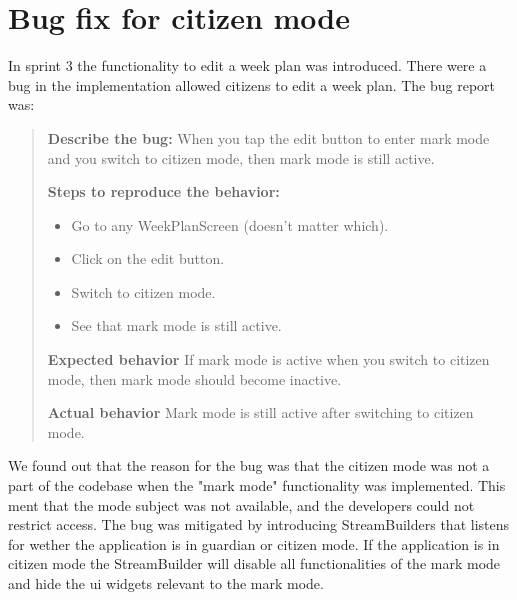 \section{Bug fix for citizen mode}
In sprint 3 the functionality to edit a week plan was introduced. There were a bug in the implementation allowed citizens to edit a week plan. The bug report was:

\begin{quote}
  \textbf{Describe the bug:} When you tap the edit button to enter mark mode and you switch to citizen mode, then mark mode is still active.

  \textbf{Steps to reproduce the behavior:}
  \begin{itemize}
    \item Go to any WeekPlanScreen (doesn't matter which).
    \item Click on the edit button.
    \item Switch to citizen mode.
    \item See that mark mode is still active.
  \end{itemize}

  \textbf{Expected behavior}
  If mark mode is active when you switch to citizen mode, then mark mode should become inactive.

  \textbf{Actual behavior}
  Mark mode is still active after switching to citizen mode.
\end{quote}

We found out that the reason for the bug was that the citizen mode was not a part of the codebase when the "mark mode" functionality was implemented. This ment that the mode subject was not available, and the developers could not restrict access. The bug was mitigated by introducing StreamBuilders that listens for wether the application is in guardian or citizen mode. If the application is in citizen mode the StreamBuilder will disable all functionalities of the mark mode and hide the \gls{ui} widgets relevant to the mark mode.
